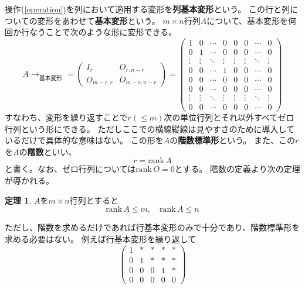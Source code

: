 \documentclass[10pt]{jsarticle}
\theoremstyle{definition}%
\newtheorem{thm}{定理}[section]%
\newcommand{\kakko}[1]{\left(#1 \right)} %
\newcommand{\rank}{\mathrm{rank\,}}
\numberwithin{equation}{section}%
\begin{document}
操作(\ref{operation})を列において適用する変形を{\bf 列基本変形}という。
この行と列についての変形をあわせて{\bf 基本変形}という。
$m\times n$行列$A$について、基本変形を何回か行なうことで次のような形に変形できる。
\begin{equation}
  A\to_{\text{基本変形}}=
  \kakko{\begin{array}{c|c} 
I_{r} & O_{r,n-r}\\ \hline
O_{m-r,r} & O_{m-r,n-r}
  \end{array}
  }=
  \kakko{\begin{array}{cccc|cccc} 
    1 & 0 & \cdots & 0 & 0 & 0 & \cdots & 0 \\ 
    0 & 1 & \cdots & 0 & 0 & 0 & \cdots & 0 \\ 
    \vdots & \vdots & \ddots & \vdots & \vdots & \vdots & \ddots & \vdots \\
    0 & 0 & \cdots & 1 & 0 & 0 & \cdots & 0 \\ \hline
    0 & 0 & \cdots & 0 & 0 & 0 & \cdots & 0 \\ 
    0 & 0 & \cdots & 0 & 0 & 0 & \cdots & 0 \\ 
    \vdots & \vdots & \ddots & \vdots & \vdots & \vdots & \ddots & \vdots \\
    0 & 0 & \cdots & 0 & 0 & 0 & \cdots & 0 
  \end{array}}
\end{equation}
すなわち、変形を繰り返すことで$r(\leq m)$次の単位行列とそれ以外すべてゼロ行列という形にできる。
ただしここでの横線縦線は見やすさのために導入しているだけで具体的な意味はない。
この形を$A$の{\bf 階数標準形}という。
また、この$r$を$A$の{\bf 階数}といい、
\begin{equation}
  r = \rank A
\end{equation}
と書く。なお、ゼロ行列については$\rank O=0$とする。
階数の定義より次の定理が導かれる。
\begin{screen}
  \begin{thm}
    $A$を$m\times n$行列とすると
    \begin{equation}
      \rank A\leq m,\quad \rank A\leq n
    \end{equation}
  \end{thm}
\end{screen}
ただし、階数を求めるだけであれば行基本変形のみで十分であり、階数標準形を求める必要はない。
例えば行基本変形を繰り返して
\begin{equation}
  \begin{pmatrix}
    1 & * & * & * & * \\
    0 & 1 & * & * & * \\
    0 & 0 & 0 & 1 & * \\
    0 & 0 & 0 & 0 & 0
  \end{pmatrix}
\end{equation}
\end{document}
